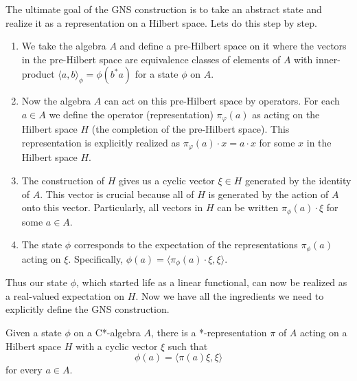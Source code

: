 The ultimate goal of the GNS construction is to take an abstract state
and realize it as a representation on a Hilbert space. Lets do this step by step.
\begin{enumerate}
    \item We take the algebra $A$ and define a pre-Hilbert space on it where the vectors
    in the pre-Hilbert space are equivalence classes of elements of $A$ with inner-product
    $\langle a, b \rangle_\phi = \phi(b^*a)$ for a state $\phi$ on $A$.
    \item Now the algebra $A$ can act on this pre-Hilbert space by operators. For
    each $a \in A$ we define the operator (representation) $\pi_\varphi (a)$ as acting
    on the Hilbert space $H$ (the completion of the pre-Hilbert space). This representation
    is explicitly realized as $\pi_\varphi(a) \cdot x = a \cdot x$ for some $x$ in
    the Hilbert space $H$.
    \item The construction of $H$ gives us a cyclic vector $\xi \in H$ generated by
    the identity of $A$. This vector is crucial because all of $H$ is generated
    by the action of $A$ onto this vector. Particularly, all vectors in $H$ can
    be written $\pi_\phi(a) \cdot \xi$ for some $a \in A$.
    \item The state $\phi$ corresponds to the expectation of the representations
    $\pi_\phi(a)$ acting on $\xi$. Specifically, $\phi(a) = \langle \pi_\phi(a) \cdot \xi, \xi \rangle$.
\end{enumerate}
Thus our state $\phi$, which started life as a linear functional, can now be realized
as a real-valued expectation on $H$. Now we have all the ingredients we need to
explicitly define the GNS construction.

\begin{theorem}
    Given a state $\phi$ on a C*-algebra $A$, there is a *-representation $\pi$ of $A$ acting
    on a Hilbert space $H$ with a cyclic vector $\xi$ such that
    \begin{equation*}
        \phi(a) = \langle \pi(a)\xi , \xi \rangle
    \end{equation*}
    for every $a \in A$.
\end{theorem}


